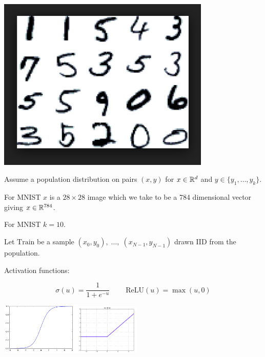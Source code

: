 {\vfill
\centerline{\includegraphics[width= 4.0in]{../images/MNIST}}
  

Assume a population distribution on pairs $(x,y)$ for $x \in \mathbb{R}^d$ and $y \in \{y_1,\ldots, y_k\}$.

\vfill
For MNIST $x$ is a $28 \times 28$ image which we take to be a 784 dimensional vector giving $x \in \mathbb{R}^{784}$.

\vfill
For MNIST $k = 10$.

\vfill
Let $\mathrm{Train}$ be a sample $(x_0,y_0),\;\ldots,\;(x_{N-1},y_{N-1})$ drawn IID from the population.


Activation functions:

\vfill
$$\sigma(u) = \frac{1}{1+e^{-u}}\;\;\;\;\;\;\;\;\mathrm{ReLU}(u) = \max(u,0)$$

\vfill
\centerline{\includegraphics[width=1.5in]{../images/sigmoid}\hspace{1.0in}\includegraphics[width=1.2in]{../images/relu}}


}
